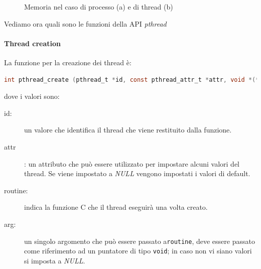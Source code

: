 \begin{figure}[hbt]
\caption{Memoria nel caso di processo (a) e di thread (b)}\label{fig:threadstack}
\end{figure}
Vediamo ora quali sono le funzioni della API \emph{pthread}
\paragraph{Thread creation}
La funzione per la creazione dei thread è:
\begin{lstlisting}[language=C,float=htb,captionpos=b,caption={Funzione di creazione dei thread},label=lst:creation]
int pthread_create (pthread_t *id, const pthread_attr_t *attr, void *(*routine)(void *), void *arg)
\end{lstlisting}
dove i valori sono:
\begin{description}
\item[id:] un valore che identifica il thread che viene restituito dalla funzione.
\item[attr]: un attributo che può essere utilizzato per impostare alcuni valori del thread. Se viene impostato a \emph{NULL} vengono impostati i valori di default.
\item[routine:] indica la funzione C che il thread eseguirà una volta creato.
\item[arg:] un singolo argomento che può essere passato a\texttt{routine}, deve essere passato come riferimento ad un puntatore di tipo \texttt{void}; in caso non vi siano valori si imposta a \emph{NULL}.
\end{description}
